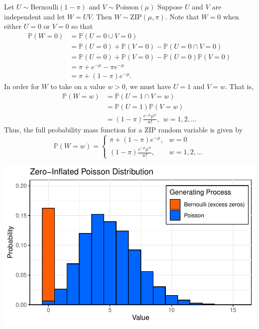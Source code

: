 \documentclass[
  12pt]{article}
\begin{document}
Let \(U \sim \text{Bernoulli}(1 - \pi)\) and
\(V \sim \text{Poisson}(\mu)\) Suppose \(U\) and \(V\) are independent
and let \(W = UV\). Then \(W \sim \text{ZIP}(\mu, \pi)\). Note that
\(W = 0\) when either \(U = 0\) or \(V = 0\) so that \[
\begin{aligned}
\mathbb{P}(W = 0) &= \mathbb{P}(U = 0 \cup V = 0) \\
                  &= \mathbb{P}(U = 0) + \mathbb{P}(V = 0) - \mathbb{P}(U = 0 \cap V = 0) \\
                  &= \mathbb{P}(U = 0) + \mathbb{P}(V = 0) - \mathbb{P}(U = 0)\mathbb{P}(V = 0) \\
                  &= \pi + e^{-\mu} - \pi e^{-\mu} \\ 
                  &= \pi + (1 - \pi)e^{-\mu}.
\end{aligned}
\] In order for \(W\) to take on a value \(w > 0\), we must have
\(U = 1\) and \(V = w\). That is, \[
\begin{aligned}
\mathbb{P}(W = w) &= \mathbb{P}(U = 1 \cap V = w) \\
                  &= \mathbb{P}(U = 1)\mathbb{P}(V = w) \\
                  &= (1-\pi)\frac{e^{-\mu}\mu^w}{w!}, \> \> w = 1, 2, ...
\end{aligned}
\] Thus, the full probability mass function for a ZIP random variable is
given by \[
\mathbb{P}(W = w) = \begin{cases}
               \pi + (1 - \pi)e^{-\mu}, &w =0 \\
               (1-\pi)\frac{e^{-\mu}\mu^w}{w!}, & w = 1, 2, ...
            \end{cases}
\]

\includegraphics{Paper_files/figure-pdf/unnamed-chunk-1-1.pdf}


  
\end{document}
